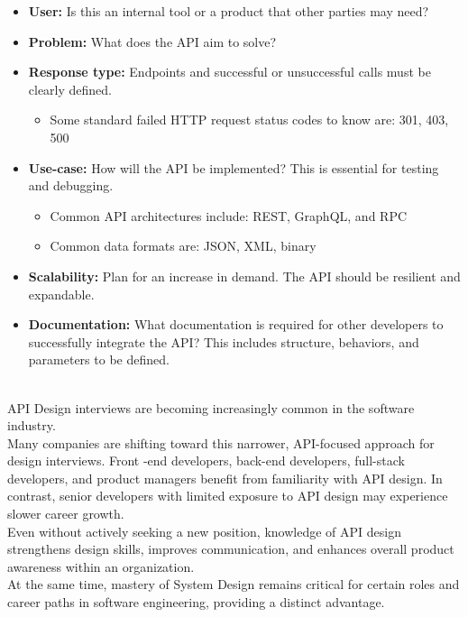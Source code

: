 \begin{itemize}
\item
\protect{}\label{VYz1rDAQ9RKXXHjLzUQ2q}
\textbf{User:} Is this an internal tool or a product that other parties may need?
\item
\protect{}\label{rvRBvSbWbWALXzBav3ZUt}
\textbf{Problem:} What does the API aim to solve?
\item
\protect{}\label{DPW69nkA_tLhGs0FUpNa2}
\textbf{Response type:} Endpoints and successful or unsuccessful calls must be clearly defined.

\begin{itemize}
\item
Some standard failed HTTP request status codes to know are: 301, 403, 500
\end{itemize}
\item
\protect{}\label{9uzGOG79AL61EjxkRggnJ}
\textbf{Use-case:} How will the API be implemented? This is essential for testing and debugging.

\begin{itemize}
\item
Common API architectures include: REST, GraphQL, and RPC
\item
Common data formats are: JSON, XML, binary
\end{itemize}
\item
\protect{}\label{eETG2JUIarAtU-_O0HT14}
\textbf{Scalability:} Plan for an increase in demand. The API should be resilient and expandable.
\item
\protect{}\label{Nam4Y8tzvTG1-CwU47mhS}
\textbf{Documentation:} What documentation is required for other developers to successfully integrate the API? This includes structure, behaviors, and parameters to be defined.
\end{itemize}
\\
API Design interviews are becoming increasingly common in the software industry.
\\
Many companies are shifting toward this narrower, API-focused approach for design interviews. Front -end developers, back-end developers, full-stack developers, and product managers benefit from familiarity with API design. In contrast, senior developers with limited exposure to API design may experience slower career growth.
\\
Even without actively seeking a new position, knowledge of API design strengthens design skills, improves communication, and enhances overall product awareness within an organization.
\\
At the same time, mastery of System Design remains critical for certain roles and career paths in software engineering, providing a distinct advantage.
\\
